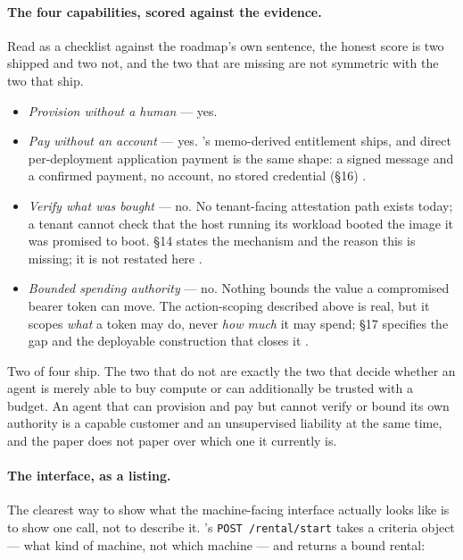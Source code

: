 \paragraph{The four capabilities, scored against the evidence.} Read as a checklist against the
roadmap's own sentence, the honest score is two shipped and two not, and the two that are missing
are not symmetric with the two that ship.

\begin{itemize}
  \item \emph{Provision without a human} --- yes. 
  \item \emph{Pay without an account} --- yes. \CumulusVPN's memo-derived entitlement ships, and
    direct per-deployment application payment is the same shape: a signed message and a
    confirmed payment, no account, no stored credential (\S16) \shipped.
  \item \emph{Verify what was bought} --- no. No tenant-facing attestation path exists today; a
    tenant cannot check that the host running its workload booted the image it was promised to
    boot. \S14 states the mechanism and the reason this is missing; it is not restated here
    \planned.
  \item \emph{Bounded spending authority} --- no. Nothing bounds the value a compromised bearer
    token can move. The action-scoping described above is real, but it scopes \emph{what} a
    token may do, never \emph{how much} it may spend; \S17 specifies the gap and the deployable
    construction that closes it \planned.
\end{itemize}

Two of four ship. The two that do not are exactly the two that decide whether an agent is merely
able to buy compute or can additionally be trusted with a budget. An agent that can provision and
pay but cannot verify or bound its own authority is a capable customer and an unsupervised
liability at the same time, and the paper does not paper over which one it currently is.

\paragraph{The interface, as a listing.} The clearest way to show what the machine-facing
interface actually looks like is to show one call, not to describe it. \FluxEdge's
\texttt{POST~/\allowbreak{}rental/\allowbreak{}start} takes a criteria object --- what kind of machine, not which machine
--- and returns a bound rental:

